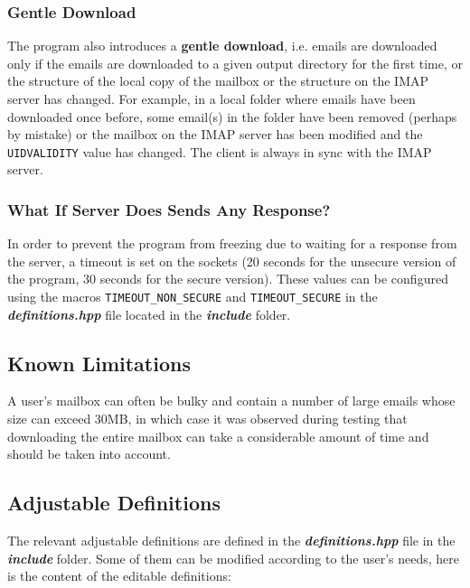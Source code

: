 \documentclass[a4paper,11pt]{article}
\begin{document}
\subsubsection{Gentle Download}
The program also introduces a \textbf{gentle download}, i.e. emails are downloaded only if the 
emails are downloaded to a given output directory for the first time, or the structure of 
the local copy of the mailbox or the structure on the IMAP server has changed. For example, 
in a local folder where emails have been downloaded once before, some email(s) in the folder 
have been removed (perhaps by mistake) or the mailbox on the IMAP server has been modified 
and the \verb!UIDVALIDITY! value has changed. The client is always in sync with the IMAP server.

\subsubsection{What If Server Does Sends Any Response?}
In order to prevent the program from freezing due to waiting for a response from the server, 
a timeout is set on the sockets (20 seconds for the unsecure version of the program, 
30 seconds for the secure version). These values can be configured using the macros 
\verb!TIMEOUT_NON_SECURE! and \verb!TIMEOUT_SECURE! in the \textbf{\textit{definitions.hpp}} 
file located in the \textbf{\textit{include}} folder.

\subsection{Known Limitations}
A user's mailbox can often be bulky and contain a number of large emails whose size can exceed 30MB, 
in which case it was observed during testing that downloading the entire mailbox can take a 
considerable amount of time and should be taken into account. 

\subsection{Adjustable Definitions}
The relevant adjustable definitions are defined in the \textbf{\textit{definitions.hpp}} file in the \textbf{\textit{include}} folder. 
Some of them can be modified according to the user's needs, here is the content of the 
editable definitions:
\end{document}
